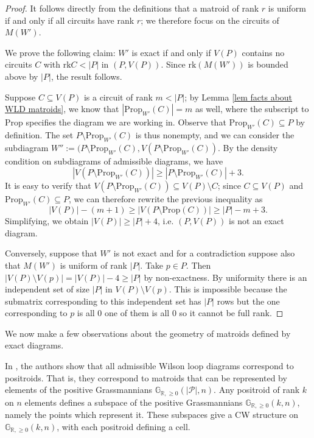 \documentclass[11pt]{article}
\newcommand{\hlfix}[2]{\texthl{#1}\todo{#2}}
\newcommand{\R}{\mathbb{R}}
\newcommand{\Gr}{\mathbb{G}_{\R, \geq 0}}
\newcommand{\rk}{\textrm{rk} }
\newcommand{\cP}{\mathcal{P}}
\newcommand{\Prop}{\textrm{Prop}}
\theoremstyle{remark}
\theoremstyle{definition}
\begin{document}
\begin{proof}
It follows directly from the definitions that a matroid of rank $r$ is uniform if and only if all circuits have rank $r$; we therefore focus on the circuits of $M(W')$.

We prove the following claim: $W'$ is exact if and only if $V(P)$ contains no circuits $C$ with $\rk C< |P|$ in $(P, V(P))$. Since $\rk(M(W'))$ is bounded above by $|P|$, the result follows.

Suppose $C \subseteq V(P)$ is a circuit of rank $m < |P|$; by Lemma \ref{lem facts about WLD matroids}, we know that $|\Prop_{W'}(C)| = m$ as well, where the subscript to $\Prop$ specifies the diagram we are working in.  Observe that $\Prop_{W'}(C)\subseteq P$ by definition. The set $P \setminus \Prop_{W'}(C)$ is thus nonempty, and we can consider the subdiagram $W'':= (P\setminus \Prop_{W'}(C),V(P\setminus\Prop_{W'}(C))$. By the density condition on subdiagrams of admissible diagrams, we have
\[|V(P\setminus\Prop_{W'}(C))| \geq |P\setminus\Prop_{W'}(C)| + 3.\]
It is easy to verify that $V(P\setminus\Prop_{W'}(C)) \subseteq V(P)\setminus C$; since $C \subseteq V(P)$ and $\Prop_{W'}(C) \subseteq P$, we can therefore rewrite the previous inequality as
\[|V(P)| - (m+1) \geq |V(P\setminus\Prop(C))| \geq |P| - m + 3.\]
Simplifying, we obtain $|V(P)| \geq |P| + 4$, i.e. $(P,V(P))$ is not an exact diagram.

Conversely, suppose that $W'$ is not exact and for a contradiction suppose also that $M(W')$ is uniform of rank $|P|$.  Take $p \in P$.  Then $|V(P)\setminus V(p)| = |V(P)| - 4 \geq |P|$ by non-exactness.  By uniformity there is an independent set of size $|P|$ in $V(P)\setminus V(p)$.  This is impossible because the submatrix corresponding to this independent set has $|P|$ rows but the one corresponding to $p$ is all $0$ one of them is all 0 so it cannot be full rank.
\end{proof}

We now make a few observations about the geometry of matroids defined by exact diagrams.

In \cite{wilsonloop}, the authors show that all admissible Wilson loop diagrams correspond to positroids. That is, they correspond to matroids that can be represented by elements of the positive Grassmannians $\Gr(|\cP|, n)$. Any positroid of rank $k$ on $n$ elements defines a subspace of the positive Grassmannians $\Gr(k, n)$, namely the points which represent it. These subspaces give a CW structure on $\Gr(k,n)$, with each positroid defining a cell. 
\end{document}
